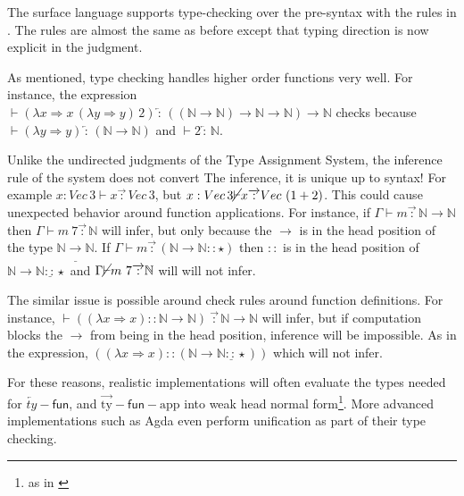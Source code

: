 The surface language supports \bidir{} type-checking over the pre-syntax with the rules in .
The rules are almost the same as before except that typing direction is now explicit in the judgment.

As mentioned, \bidir{} type checking handles higher order functions very well.
For instance, the expression $\vdash(\lambda x\Rightarrow x\,(\lambda y\Rightarrow y)\,2)\overleftarrow{\,:\,}\left(\left(\mathbb{N}\rightarrow\mathbb{N}\right)\rightarrow\mathbb{N}\rightarrow\mathbb{N}\right)\rightarrow\mathbb{N}$ checks because $\vdash(\lambda y\Rightarrow y)\overleftarrow{\,:\,}\left(\mathbb{N}\rightarrow\mathbb{N}\right)$ and $\vdash2\overleftarrow{\,:\,}\mathbb{N}$.

Unlike the undirected judgments of the Type Assignment System, the inference rule of the \bidir{} system does not convert
The inference, it is unique up to syntax!
For example $x:Vec\,3\vdash x\overrightarrow{\,:\,}Vec\,3$, but $x:Vec\,3\cancel{\vdash}x\overrightarrow{\,:\,}Vec\,\left(1+2\right)$.
This could cause unexpected behavior around function applications.
For instance, if $\Gamma\vdash m\overrightarrow{\,:\,}\mathbb{N}\rightarrow\mathbb{N}$ then $\Gamma\vdash m\:7\overrightarrow{\,:\,}\mathbb{N}$ will infer, but only because the $\rightarrow$ is in the head position of the type $\mathbb{N}\underline{\rightarrow}\mathbb{N}$.
If $\Gamma\vdash m\overrightarrow{\,:\,}\left(\mathbb{N}\rightarrow\mathbb{N}::\star\right)$ then $::$ is in the head position of $\mathbb{N}\rightarrow\mathbb{N}\underline{::}\star$ and $\Gamma\cancel{\vdash}m\ 7\overrightarrow{\,:\,}\mathbb{N}$ will will not infer.

The similar issue is possible around check rules around function definitions.
For instance, $\vdash\left((\lambda x\Rightarrow x)::\mathbb{N}\rightarrow\mathbb{N}\right)\ \overrightarrow{\,:\,}\mathbb{N}\rightarrow\mathbb{N}$ will infer, but if computation blocks the $\rightarrow$ from being in the head position, inference will be impossible.
As in the expression, $\left((\lambda x\Rightarrow x)::\left(\mathbb{N}\rightarrow\mathbb{N}\underline{::}\star\right)\right)$ which will not infer.

For these reasons, realistic implementations will often evaluate the types needed for $\overleftarrow{ty}-\mathsf{fun}$, and $\operatorname{\overrightarrow{ty}-\mathsf{fun}-app}$ into weak head normal form\footnote{as in \cite{COQUAND1996167}}.
More advanced \bidir{} implementations such as Agda\cite{norell2007towards} even perform unification as part of their \bidir{} type checking.

